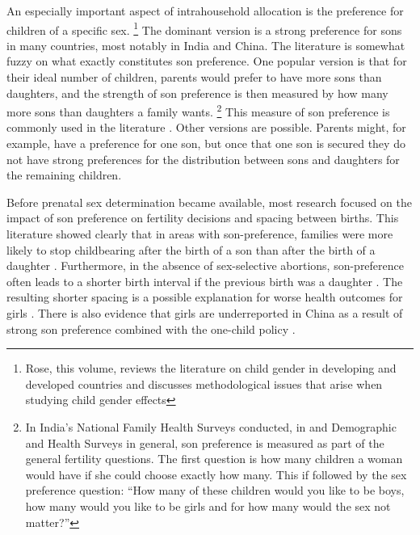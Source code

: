 \documentclass[letterpaper,12pt]{article}
\begin{document}
An especially important aspect of intrahousehold allocation is the
preference for children of a specific sex.%
\footnote{
Rose, this volume, reviews the literature on child gender in developing
and developed countries and discusses methodological issues that arise
when studying child gender effects} The dominant version is a strong
preference for sons in many countries, most notably in India and China. 
The literature is somewhat fuzzy on what exactly constitutes son
preference. 
One popular version is that for their ideal number of children, parents
would prefer to have more sons than daughters, and the strength of son
preference is then measured by how many more sons than daughters a
family wants.%
\footnote{
In India's National Family Health Surveys conducted, in and Demographic
and Health Surveys in general, son preference is measured as part of the
general fertility questions. 
The first question is how many children a woman would have if she could
choose exactly how many. 
This if followed by the sex preference question: ``How many of these
children would you like to be boys, how many would you like to be girls
and for how many would the sex not matter?''} This measure of son
preference is commonly used in the literature
\citep[e.g.]{clark00,Jensen2009,Hu2015}. 
Other versions are possible. 
Parents might, for example, have a preference for one son, but once that
one son is secured they do not have strong preferences for the
distribution between sons and daughters for the remaining children.

Before prenatal sex determination became available, most research
focused on the impact of son preference on fertility decisions and
spacing between births. 
This literature showed clearly that in areas with son-preference,
families were more likely to stop childbearing after the birth of a son
than after the birth of a daughter \citep[see, for
example,][]{Das1987,Arnold1997,clark00,filmer09}. 
Furthermore, in the absence of sex-selective abortions, son-preference
often leads to a shorter birth interval if the previous birth was a
daughter \citep[see, for
example,][]{Das1987,Rahman1993,Pong1994,Haughton1996,Arnold1997}. 
The resulting shorter spacing is a possible explanation for worse health
outcomes for girls
\citep{arnold98,Whitworth2002,Rutstein2005,Conde-Agudelo2006}. 
There is also evidence that girls are underreported in China as a result
of strong son preference combined with the one-child policy
\citep{Merli2000}.
\end{document}
